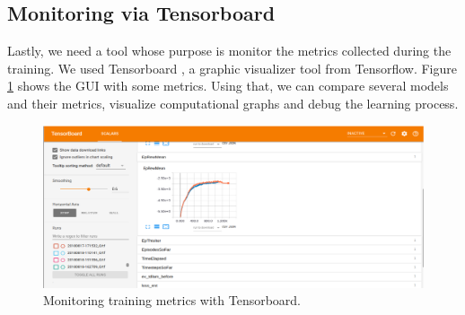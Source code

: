 \subsection{Monitoring via Tensorboard}
Lastly, we need a tool whose purpose is monitor the metrics collected during the training. We used Tensorboard \cite{tensorboard}, a graphic visualizer tool from Tensorflow. Figure \ref{fig:tensorboard} shows the GUI with some metrics. Using that, we can compare several models and their metrics, visualize computational graphs and debug the learning process.

\begin{figure}[!htbp]
	\centering
	\includegraphics[width=1.0\textwidth]{Cap5/tensorboard.eps}
	\caption{ Monitoring training metrics with Tensorboard.
	}
	\label{fig:tensorboard}
\end{figure}